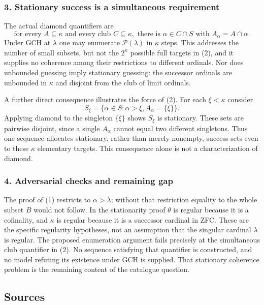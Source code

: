 \documentclass[11pt,a4paper]{article}
\begin{document}
\subsubsection{3. Stationary success is a simultaneous requirement}
The actual diamond quantifiers are
\[\text{for every }A\subseteq\kappa\text{ and every club }C\subseteq\kappa,
\text{ there is }\alpha\in C\cap S\text{ with }A_\alpha=A\cap\alpha.\tag{2}\]
Under GCH at $\lambda$ one may enumerate $\mathcal P(\lambda)$ in $\kappa$ steps. This addresses the number of small subsets, but not the $2^\kappa$ possible full targets in (2), and it supplies no coherence among their restrictions to different ordinals. Nor does unbounded guessing imply stationary guessing: the successor ordinals are unbounded in $\kappa$ and disjoint from the club of limit ordinals.

A further direct consequence illustrates the force of (2). For each $\xi<\kappa$ consider
\[S_\xi=\{\alpha\in S:\alpha>\xi, A_\alpha=\{\xi\}\}.
\]
Applying diamond to the singleton $\{\xi\}$ shows $S_\xi$ is stationary. These sets are pairwise disjoint, since a single $A_\alpha$ cannot equal two different singletons. Thus one sequence allocates stationary, rather than merely nonempty, success sets even to these $\kappa$ elementary targets. This consequence alone is not a characterization of diamond.

\subsubsection{4. Adversarial checks and remaining gap}
The proof of (1) restricts to $\alpha>\lambda$; without that restriction equality to the whole subset $B$ would not follow. In the stationarity proof $\theta$ is regular because it is a cofinality, and $\kappa$ is regular because it is a successor cardinal in ZFC. These are the specific regularity hypotheses, not an assumption that the singular cardinal $\lambda$ is regular. The proposed enumeration argument fails precisely at the simultaneous club quantifier in (2). No sequence satisfying that quantifier is constructed, and no model refuting its existence under GCH is supplied. That stationary coherence problem is the remaining content of the catalogue question.

\subsection{Sources}
\end{document}
